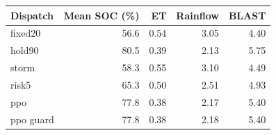 \begin{tabular}{lrrrr}
\toprule
Dispatch & Mean SOC (\%) & ET & Rainflow & BLAST \\
\midrule
fixed20 & 56.6 & 0.54 & 3.05 & 4.40 \\
hold90 & 80.5 & 0.39 & 2.13 & 5.75 \\
storm & 58.3 & 0.55 & 3.10 & 4.49 \\
risk5 & 65.3 & 0.50 & 2.51 & 4.93 \\
ppo & 77.8 & 0.38 & 2.17 & 5.40 \\
ppo guard & 77.8 & 0.38 & 2.18 & 5.40 \\
\bottomrule
\end{tabular}

